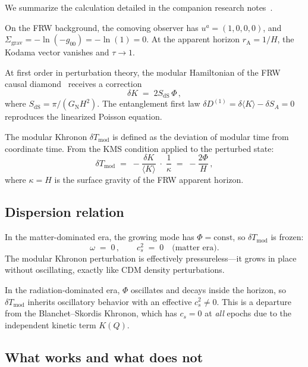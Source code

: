 \documentclass[prd,twocolumn,superscriptaddress,longbibliography,floatfix]{revtex4-2}
\newcommand{\tauasym}{\tau}
\newcommand{\Tmod}{T_{\mathrm{mod}}}
\newcommand{\GN}{G_{\mathrm{N}}}
\newcommand{\SdS}{S_{\mathrm{dS}}}
\newcommand{\rA}{r_{\mathrm{A}}}
\begin{document}
We summarize the calculation detailed in the companion
research notes~\cite{Paper4Notes}.

On the FRW background, the comoving observer has
$u^a = (1,0,0,0)$, and $\Sigma_{\mathrm{grav}} =
-\ln(-g_{00}) = -\ln(1) = 0$.  At the apparent horizon
$\rA = 1/H$, the Kodama vector vanishes and
$\tauasym \to 1$.

At first order in perturbation theory, the modular
Hamiltonian of the FRW causal diamond~\cite{AalsmaBak2025}
receives a correction
\begin{equation}
\delta K \;=\; 2\SdS\,\Phi\,,
\label{eq:delta_K}
\end{equation}
where $\SdS = \pi/(\GN H^2)$.  The entanglement first law
$\delta D^{(1)} = \delta\langle K\rangle - \delta S_A = 0$
reproduces the linearized Poisson equation.

The modular Khronon $\delta\Tmod$ is defined as the
deviation of modular time from coordinate time.  From the
KMS condition applied to the perturbed state:
\begin{equation}
\delta\Tmod \;=\; -\frac{\delta K}{\langle K\rangle}
\;\cdot\; \frac{1}{\kappa}
\;=\; -\frac{2\Phi}{H}\,,
\label{eq:delta_Tmod}
\end{equation}
where $\kappa = H$ is the surface gravity of the FRW
apparent horizon.

\subsection{Dispersion relation}

In the matter-dominated era, the growing mode has
$\Phi = \mathrm{const}$, so $\delta\Tmod$ is frozen:
\begin{equation}
\omega \;=\; 0\,,\qquad c_s^2 \;=\; 0
\quad\text{(matter era).}
\label{eq:dispersion_matter}
\end{equation}
The modular Khronon perturbation is effectively
pressureless---it grows in place without oscillating,
exactly like CDM density perturbations.

In the radiation-dominated era, $\Phi$ oscillates and
decays inside the horizon, so $\delta\Tmod$ inherits
oscillatory behavior with an effective
$c_s^2 \neq 0$.  This is a departure from the
Blanchet--Skordis Khronon, which has $c_s = 0$ at
\emph{all} epochs due to the independent kinetic term
$K(Q)$.

\subsection{What works and what does not}
\end{document}
